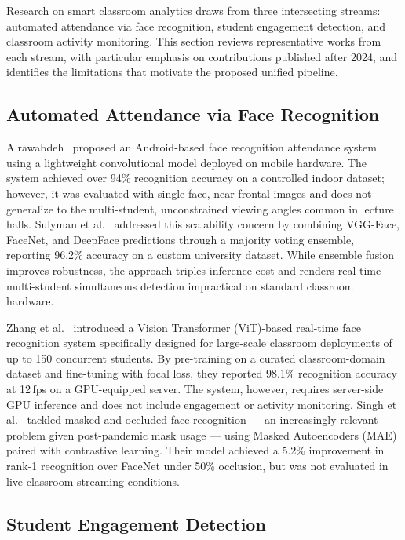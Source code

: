 \documentclass[preprint,12pt]{elsarticle}
\begin{document}
Research on smart classroom analytics draws from three intersecting streams: automated attendance via face recognition, student engagement detection, and classroom activity monitoring. This section reviews representative works from each stream, with particular emphasis on contributions published after 2024, and identifies the limitations that motivate the proposed unified pipeline.

\subsection{Automated Attendance via Face Recognition}

Alrawabdeh~\cite{attendance_android} proposed an Android-based face recognition attendance system using a lightweight convolutional model deployed on mobile hardware. The system achieved over 94\% recognition accuracy on a controlled indoor dataset; however, it was evaluated with single-face, near-frontal images and does not generalize to the multi-student, unconstrained viewing angles common in lecture halls. Sulyman et al.~\cite{ensemble_ieee} addressed this scalability concern by combining VGG-Face, FaceNet, and DeepFace predictions through a majority voting ensemble, reporting 96.2\% accuracy on a custom university dataset. While ensemble fusion improves robustness, the approach triples inference cost and renders real-time multi-student simultaneous detection impractical on standard classroom hardware.

Zhang et al.~\cite{lit_facerecog_transformer_2025} introduced a Vision Transformer (ViT)-based real-time face recognition system specifically designed for large-scale classroom deployments of up to 150 concurrent students. By pre-training on a curated classroom-domain dataset and fine-tuning with focal loss, they reported 98.1\% recognition accuracy at 12\,fps on a GPU-equipped server. The system, however, requires server-side GPU inference and does not include engagement or activity monitoring. Singh et al.~\cite{lit_transformer_attendance_2025} tackled masked and occluded face recognition --- an increasingly relevant problem given post-pandemic mask usage --- using Masked Autoencoders (MAE) paired with contrastive learning. Their model achieved a 5.2\% improvement in rank-1 recognition over FaceNet under 50\% occlusion, but was not evaluated in live classroom streaming conditions.

\subsection{Student Engagement Detection}
\end{document}
